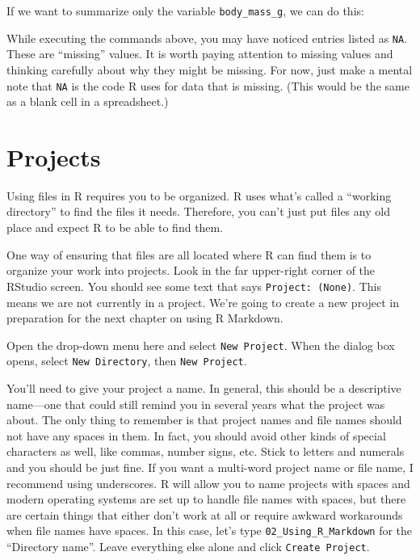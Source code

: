 \documentclass[
]{book}
\newenvironment{Shaded}{\begin{snugshade}}{\end{snugshade}}
\newcommand{\FunctionTok}[1]{\textcolor[rgb]{0.00,0.00,0.00}{#1}}
\newcommand{\NormalTok}[1]{#1}
\newcommand{\SpecialCharTok}[1]{\textcolor[rgb]{0.00,0.00,0.00}{#1}}
\begin{document}
If we want to summarize only the variable \texttt{body\_mass\_g}, we can do this:

\begin{Shaded}
\end{Shaded}

While executing the commands above, you may have noticed entries listed as \texttt{NA}. These are ``missing'' values. It is worth paying attention to missing values and thinking carefully about why they might be missing. For now, just make a mental note that \texttt{NA} is the code R uses for data that is missing. (This would be the same as a blank cell in a spreadsheet.)

\hypertarget{intror-projects}{%
\section{Projects}\label{intror-projects}}

Using files in R requires you to be organized. R uses what's called a ``working directory'' to find the files it needs. Therefore, you can't just put files any old place and expect R to be able to find them.

One way of ensuring that files are all located where R can find them is to organize your work into projects. Look in the far upper-right corner of the RStudio screen. You should see some text that says \texttt{Project:\ (None)}. This means we are not currently in a project. We're going to create a new project in preparation for the next chapter on using R Markdown.

Open the drop-down menu here and select \texttt{New\ Project}. When the dialog box opens, select \texttt{New\ Directory}, then \texttt{New\ Project}.

You'll need to give your project a name. In general, this should be a descriptive name---one that could still remind you in several years what the project was about. The only thing to remember is that project names and file names should not have any spaces in them. In fact, you should avoid other kinds of special characters as well, like commas, number signs, etc. Stick to letters and numerals and you should be just fine. If you want a multi-word project name or file name, I recommend using underscores. R will allow you to name projects with spaces and modern operating systems are set up to handle file names with spaces, but there are certain things that either don't work at all or require awkward workarounds when file names have spaces. In this case, let's type \texttt{02\_Using\_R\_Markdown} for the ``Directory name''. Leave everything else alone and click \texttt{Create\ Project}.
\end{document}
